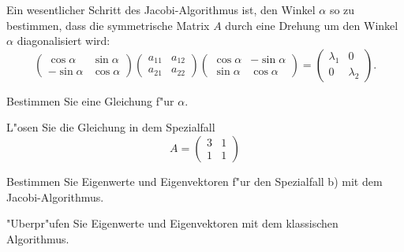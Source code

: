 Ein wesentlicher Schritt des Jacobi-Algorithmus ist, den Winkel
$\alpha$ so zu bestimmen, dass die symmetrische Matrix $A$ durch eine Drehung
um den Winkel $\alpha$ diagonalisiert wird:
\[
\begin{pmatrix}
 \cos\alpha&\sin\alpha\\
-\sin\alpha&\cos\alpha
\end{pmatrix}
\begin{pmatrix}
a_{11}&a_{12}\\
a_{21}&a_{22}
\end{pmatrix}
\begin{pmatrix}
 \cos\alpha&-\sin\alpha\\
 \sin\alpha& \cos\alpha
\end{pmatrix}
=
\begin{pmatrix}
\lambda_1&0\\
0&\lambda_2
\end{pmatrix}.
\]
\begin{teilaufgaben}
\item Bestimmen Sie eine Gleichung f"ur $\alpha$.
\item L"osen Sie die Gleichung in dem Spezialfall
\[
A=\begin{pmatrix}
3&1\\
1&1
\end{pmatrix}
\]
\item Bestimmen Sie Eigenwerte und Eigenvektoren f"ur den
Spezialfall b) mit dem Jacobi-Algorithmus.
\item "Uberpr"ufen Sie Eigenwerte und Eigenvektoren mit dem klassischen
Algorithmus.
\end{teilaufgaben}

